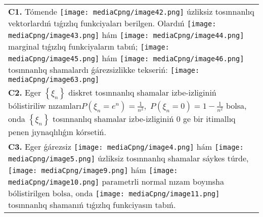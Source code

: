 \documentclass{article}
\begin{document}
\begin{tabular}{m{17cm}}
\textbf{C1.} Tómende \texttt{[image: mediaCpng/image42.png]} úzliksiz tosınnanlıq vektorlardıń tıǵızlıq funkciyaları berilgen. Olardıń \texttt{[image: mediaCpng/image43.png]} hám \texttt{[image: mediaCpng/image44.png]} marginal tıǵızlıq funkciyaların tabıń; \texttt{[image: mediaCpng/image45.png]} hám \texttt{[image: mediaCpng/image46.png]} tosınnanlıq shamalardı ǵárezsizlikke tekseriń: \texttt{[image: mediaCpng/image63.png]}
 \\
\textbf{C2.} Eger \(\left\{ \xi_{n} \right\}\) diskret tosınnanlıq shamalar izbe-izliginiń bólistiriliw nızamları\(P(\xi_{n} = e^{n}) = \frac{1}{n^{2}},\) \(P(\xi_{n} = 0) = 1 - \frac{1}{n^{2}}\) bolsa, onda \(\left\{ \xi_{n} \right\}\) tosınnanlıq shamalar izbe-izliginiń 0 ge bir itimallıq penen jıynaqlılıǵın kórsetiń.
 \\
\textbf{C3.} Eger ǵárezsiz \texttt{[image: mediaCpng/image4.png]} hám \texttt{[image: mediaCpng/image5.png]} úzliksiz tosınnanlıq shamalar sáykes túrde, \texttt{[image: mediaCpng/image9.png]} hám \texttt{[image: mediaCpng/image10.png]} parametrli normal nızam boyınsha bólistirilgen bolsa, onda \texttt{[image: mediaCpng/image11.png]} tosınnanlıq shamanıń tıǵızlıq funkciyasın tabıń.
 \\

\end{tabular}
\vspace{1cm}
\end{document}
